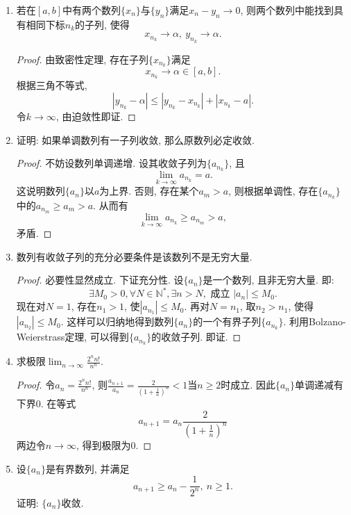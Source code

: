 \documentclass[UTF8,11pt, a4paper, oneside, fontset=none]{ctexbook}
\begin{document}
\begin{enumerate}
\item 若在$[a, b]$中有两个数列$\{ x_n \}$与$\{ y_n \}$满足$x_n - y_n \to 0$, 则两个数列中能找到具有相同下标$n_k$的子列, 使得
\[
x_{n_k} \to \alpha, \ y_{n_k} \to \alpha.
\]

\begin{proof}
由致密性定理, 存在子列$\{x_{n_k} \}$满足
\[
x_{n_k} \to \alpha \in [a, b].
\]
根据三角不等式,
\[
|y_{n_k} - \alpha| \leq |y_{n_k} - x_{n_k}| + |x_{n_k} - a|.
\]
令$k \to \infty$, 由迫敛性即证.

\end{proof}

\item 证明: 如果单调数列有一子列收敛, 那么原数列必定收敛.

\begin{proof}
不妨设数列单调递增. 设其收敛子列为$\{a_{n_k} \}$, 且
\[
\lim_{k \to \infty} a_{n_k} = a.
\]
这说明数列$\{ a_n\}$以$a$为上界. 否则, 存在某个$a_m >a$, 则根据单调性, 存在$\{ a_{n_k}\}$中的$a_{n_m} \geq a_m >a$. 从而有
\[
\lim_{k \to \infty} a_{n_k} \geq a_{n_m} >a,
\]
矛盾.
\end{proof}

\item 数列有收敛子列的充分必要条件是该数列不是无穷大量.


\begin{proof}
必要性显然成立. 下证充分性. 设$\{a_n\}$是一个数列, 且非无穷大量. 即:
\[
\exists M_0>0, \forall N \in \mathbb N^*, \exists n >N, \mbox{ 成立 } |a_n| \leq M_0.
\]
现在对$N=1$, 存在$n_1 > 1$, 使$| a_{n_1} |\leq M_0 $. 再对$N= n_1$, 取$n_2 > n_1$, 使得$|a_{n_2}| \leq M_0 $. 这样可以归纳地得到数列$\{a_n\}$的一个有界子列$\{ a_{n_k}\}$. 利用Bolzano-Weierstrass定理, 可以得到$\{ a_{n_k}\}$的收敛子列. 即证. 
\end{proof}

\item 求极限$\lim_{n \to \infty} \frac{2^n n!}{n^n}$.

\begin{proof}
令$a_n = \frac{2^n n!}{n^n}$, 则$\frac{a_{n+1}}{a_n} = \frac{2}{(1+\frac{1}{n})^n} <1$当$n \geq 2$时成立. 因此$\{a_n\}$单调递减有下界0. 在等式
\[
a_{n+1} = a_n \frac{2}{(1+\frac{1}{n})^n}
\]
两边令$n \to \infty$, 得到极限为0.
\end{proof}

\item 设$\{a_n\}$是有界数列, 并满足
\[
a_{n+1} \geq a_n - \frac{1}{2^n}, \ n \geq 1.
\]
证明: $\{a_n\}$收敛.



\end{enumerate}
\end{document}
